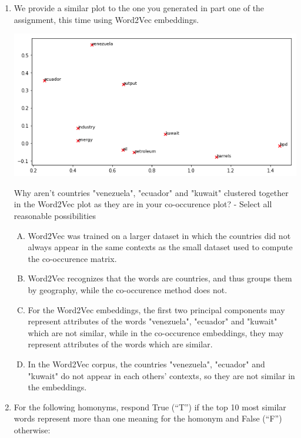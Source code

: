 \begin{enumerate}[1.]
\item {}

We provide a similar plot to the one you generated in part one of the assignment, this time using Word2Vec embeddings.

\begin{center}
\includegraphics[width=1\textwidth]{embeddings_plot.png}
\end{center}

Why aren't countries "venezuela", "ecuador" and "kuwait" clustered together in the Word2Vec plot as they are in your co-occurence plot? - Select all reasonable possibilities

\begin{enumerate}[A)]
\item Word2Vec was trained on a larger dataset in which the countries did not always appear in the same contexts as the small dataset used to compute the co-occurence matrix.
\item Word2Vec recognizes that the words are countries, and thus groups them by geography, while the co-occurence method does not. 
\item For the Word2Vec embeddings, the first two principal components may represent attributes of the words "venezuela", "ecuador" and "kuwait" which are not similar, while in the co-occurence embeddings, they may represent attributes of the words which are similar. 
\item In the Word2Vec corpus, the countries "venezuela", "ecuador" and "kuwait" do not appear in each others’ contexts, so they are not similar in the embeddings.
\end{enumerate}

\item {}

For the following homonyms, respond True (``T'') if the top 10 most similar words represent more than one meaning for the homonym and False (``F'') otherwise:


\end{enumerate}
